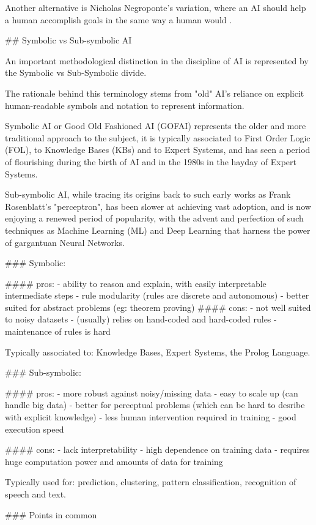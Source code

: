 Another alternative is Nicholas Negroponte's variation, where an AI should help a human accomplish goals in the same way a human would \cite{smith2006history}.

## Symbolic vs Sub-symbolic AI

An important methodological distinction in the discipline of AI is represented by the Symbolic vs Sub-Symbolic divide.

The rationale behind this terminology stems from "old" AI's reliance on explicit human-readable symbols and notation to represent information.

Symbolic AI or Good Old Fashioned AI (GOFAI) represents the older and more traditional approach to the subject, it is typically associated to First Order Logic (FOL), to Knowledge Bases (KBs) and to Expert Systems, and has seen a period of flourishing during the birth of AI and in the 1980s in the hayday of Expert Systems.

Sub-symbolic AI, while tracing its origins back to such early works as Frank Rosenblatt's "perceptron", has been slower at achieving vast adoption, and is now enjoying a renewed period of popularity, with the advent and perfection of such techniques as Machine Learning (ML) and Deep Learning that harness the power of gargantuan Neural Networks.

### Symbolic:

#### pros:
- ability to reason and explain, with easily interpretable intermediate steps
- rule modularity (rules are discrete and autonomous)
- better suited for abstract problems (eg: theorem proving)
#### cons:
- not well suited to noisy datasets
- (usually) relies on hand-coded and hard-coded rules
- maintenance of rules is hard

Typically associated to: Knowledge Bases, Expert Systems, the Prolog Language.

### Sub-symbolic:

#### pros:
- more robust against noisy/missing data
- easy to scale up (can handle big data)
- better for perceptual problems (which can be hard to desribe with explicit knowledge)
- less human intervention required in training
- good execution speed

#### cons:
- lack interpretability
- high dependence on training data
- requires huge computation power and amounts of data for training

Typically used for: prediction, clustering, pattern classification, recognition of speech and text.

### Points in common

